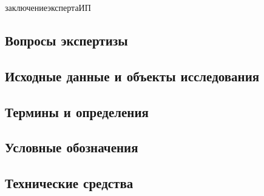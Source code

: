





\thispagestyle{empty}  %







{заключениеэкспертаИП}


\subsection{Вопросы экспертизы}


\subsection{Исходные данные и объекты исследования}


%

\printbibliography 



\subsection{Термины и определения}


\subsection{Условные обозначения}


\subsection{Технические средства}


%




%

%

%
%
%

 

